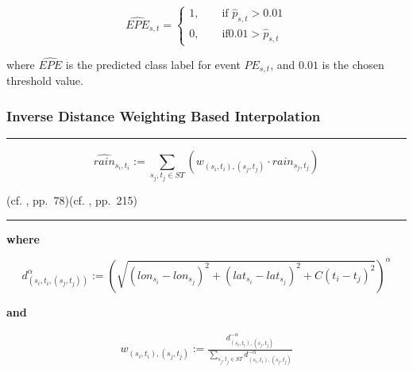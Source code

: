 \documentclass[
  12pt,
]{article}
\begin{document}
\begin{mdframed}[leftline = true, rightline = true, topline = false, bottomline = false, frametitle = {Classifier based on the GAMM (confer equation \ref{eq:gamm_model_equation_appendix})}]
\begin{equation}\label{eq:classifier_layer_gamm}
\widehat{EPE}_{s,t} =
\begin{cases}
1, \qquad \text{if } \widehat{p}_{s,t} > 0.01 \\
0, \qquad \text{if} 0.01 > \widehat{p}_{s,t}
\end{cases}
\end{equation}
\end{mdframed}

where \(\widehat{EPE}\) is the predicted class label for event
\(PE_{s,t}\), and \(0.01\) is the chosen threshold value.

\clearpage

\hypertarget{inverse-distance-weighting-based-interpolation}{%
\subsubsection{Inverse Distance Weighting Based
Interpolation}\label{inverse-distance-weighting-based-interpolation}}

\rule{1\linewidth}{0.5pt}

\begin{equation}\label{eq:inverse_distance_weighting_interpolated_precipitation_equation}
\widehat{rain}_{s_i,t_i} := {\displaystyle \sum_{s_j,t_j\in ST}} \left(w_{(s_i,t_i),(s_j,t_j)} \cdot rain_{s_j,t_j}\right)
\end{equation}

(cf. \citet{Wikle.2019} , pp.~78)(cf. \citet{Bivand.2013} , pp.~215)

\rule{1\linewidth}{0.5pt}

\begin{center}
\textbf{where}
\end{center}

\begin{equation}\label{eq:euclidean_distance_equation}
d_{(s_i,t_i,(s_j,t_j))}^{\alpha} := \left(\sqrt{(lon_{s_i}-lon_{s_j})^2 + (lat_{s_i}-lat_{s_j})^2 + C(t_{i}-t_{j})^2}\right)^{\alpha}
\end{equation}

\begin{center}
\textbf{and}
\end{center}

\begin{equation}\label{eq:weight_equation}
\begin{aligned}
w_{(s_i,t_i),(s_j,t_j)} := \frac{d_{(s_i,t_i),(s_j,t_j)}^{-\alpha}}{{\displaystyle \sum_{s_j,t_j\in ST}} d_{(s_i,t_i),(s_j,t_j)}^{-\alpha}}
\end{aligned}
\end{equation}
\end{document}
